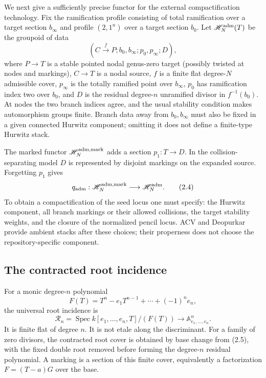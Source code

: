 \documentclass[11pt]{article}
\newcommand{\A}{\mathbb A}
\newcommand{\Spec}{\operatorname{Spec}}
\begin{document}
We next give a sufficiently precise functor for the external compactification
technology.  Fix the ramification profile consisting of total ramification
over a target section $b_\infty$ and profile $(2,1^n)$ over a target section
$b_0$.  Let $\mathscr H_N^{\rm adm}(T)$ be the groupoid of data
\[
 (C\xrightarrow{f}P; b_0,b_\infty; p_0,p_\infty; D),              \tag{2.3}
\]
where $P\to T$ is a stable pointed nodal genus-zero target (possibly twisted
at nodes and markings), $C\to T$ is a nodal source, $f$ is a finite flat
degree-$N$ admissible cover, $p_\infty$ is the totally ramified point over
$b_\infty$, $p_0$ has ramification index two over $b_0$, and $D$ is the
residual degree-$n$ unramified divisor in $f^{-1}(b_0)$.  At nodes the two
branch indices agree, and the usual stability condition makes automorphism
groups finite.  Branch data away from $b_0,b_\infty$ must also be fixed in a
given connected Hurwitz component; omitting it does not define a finite-type
Hurwitz stack.

The marked functor $\mathscr H_N^{\rm adm,mark}$ adds a section
$p_1:T\to D$.  In the collision-separating model $D$ is represented by
disjoint markings on the expanded source.  Forgetting $p_1$ gives
\[
 q_{\rm adm}:\mathscr H_N^{\rm adm,mark}
       \longrightarrow\mathscr H_N^{\rm adm}.                         \tag{2.4}
\]
To obtain a compactification of the seed locus one must specify: the Hurwitz
component, all branch markings or their allowed collisions, the target
stability weights, and the closure of the normalized pencil locus.  ACV and
Deopurkar provide ambient stacks after these choices; their properness does
not choose the repository-specific component.

\subsection{The contracted root incidence}

For a monic degree-$n$ polynomial
\[
 F(T)=T^n-e_1T^{n-1}+\cdots+(-1)^ne_n,
\]
the universal root incidence is
\[
 \mathcal R_n=\Spec
 k[e_1,\ldots,e_n,T]/(F(T))
 \longrightarrow \A^n_{e_1,\ldots,e_n}.                            \tag{2.5}
\]
It is finite flat of degree $n$.  It is not etale along the discriminant.
For a family of zero divisors, the contracted root cover is obtained by
base change from (2.5), with the fixed double root removed before forming the
degree-$n$ residual polynomial.  A marking is a section of this finite cover,
equivalently a factorization $F=(T-a)G$ over the base.
\end{document}
